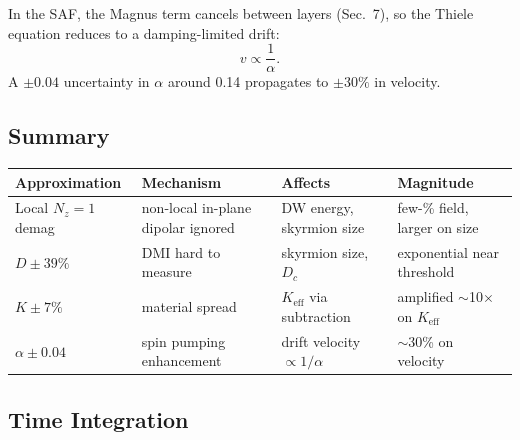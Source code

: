 \documentclass[11pt,a4paper]{article}
\newcommand{\Keff}{K_{\text{eff}}}
\begin{document}
In the SAF, the Magnus term cancels between layers
(Sec.~7), so the Thiele equation
reduces to a damping-limited drift:
%
\begin{equation}
v \propto \frac{1}{\alpha}.
\end{equation}
%
A $\pm 0.04$ uncertainty in $\alpha$ around 0.14 propagates to
$\pm 30\%$ in velocity.

\subsection{Summary}

\begin{table}[h!]
\centering
\footnotesize
\setlength{\tabcolsep}{3pt}
\begin{tabular}{@{}llll@{}}
\toprule
Approximation & Mechanism & Affects & Magnitude \\
\midrule
Local $N_z = 1$ demag
    & non-local in-plane dipolar ignored
    & DW energy, skyrmion size
    & few-\% field, larger on size \\
$D \pm 39\%$
    & DMI hard to measure
    & skyrmion size, $D_c$
    & exponential near threshold \\
$K \pm 7\%$
    & material spread
    & $\Keff$ via subtraction
    & amplified $\sim$10$\times$ on $\Keff$ \\
$\alpha \pm 0.04$
    & spin pumping enhancement
    & drift velocity $\propto 1/\alpha$
    & $\sim$30\% on velocity \\
\bottomrule
\end{tabular}
\end{table}

\subsection{Time Integration}
\end{document}
